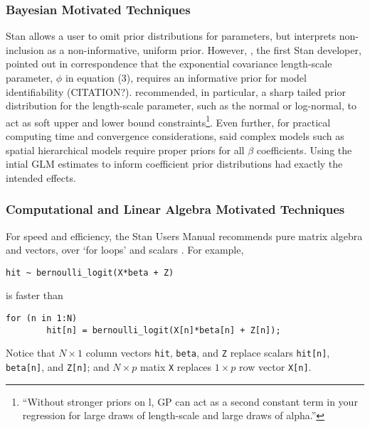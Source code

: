 \documentclass{article}
\begin{document}
\subsubsection{Bayesian Motivated Techniques} %

Stan allows a user to omit prior distributions for parameters, but interprets non-inclusion as a non-informative, uniform prior. However, \cite{Gelman}, the first Stan developer, pointed out in correspondence that the exponential covariance length-scale parameter, $\phi$ in equation (3), requires an informative prior for model identifiability (CITATION?). \cite{Trangucci} recommended, in particular, a sharp tailed prior distribution for the length-scale parameter, such as the normal or log-normal, to act as soft upper and lower bound constraints\footnote{``Without stronger priors on l, GP can act as a second constant term in your regression for large draws of length-scale and large draws of alpha.''}. Even further, for practical computing time and convergence considerations, \cite{Trangucci} said complex models such as spatial hierarchical models require proper priors for all $\beta$ coefficients. Using the intial GLM estimates to inform coefficient prior distributions had exactly the intended effects.

\subsubsection{Computational and Linear Algebra Motivated Techniques} %
For speed and efficiency, the Stan Users Manual recommends pure matrix algebra and vectors, over `for loops' and scalars \cite{StantheMAN}. For example, 
\begin{verbatim}
hit ~ bernoulli_logit(X*beta + Z)
\end{verbatim}
is faster than
\begin{verbatim}
for (n in 1:N)
        hit[n] = bernoulli_logit(X[n]*beta[n] + Z[n]);
\end{verbatim}
Notice that $N \times 1$ column vectors \verb|hit|, \verb|beta|, and \verb|Z| replace scalars \verb|hit[n]|, \verb|beta[n]|, and \verb|Z[n]|; and $N \times p$ matix \verb|X| replaces $1 \times p$ row vector \verb|X[n]|.
\end{document}
